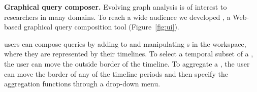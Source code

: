 

{\bf Graphical query composer.} Evolving graph analysis is of interest
to researchers in many domains.  To reach a wide audience we
developed \qlui, a Web-based graphical query composition tool
(Figure~\ref{fig:ui}).

\qlui users can compose queries by adding to and manipulating \tg{}s
in the workspace, where they are represented by their timelines.  To
select a temporal subset of a \tg, the user can move the outside
border of the timeline.  To aggregate a \tg, the user can move the
border of any of the timeline periods and then specify the aggregation
functions through a drop-down menu.

